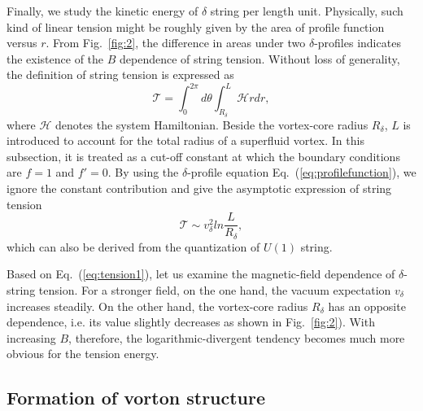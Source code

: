 \documentclass[prd, showpacs,nofootinbib,amsmath,amssymb]{revtex4}
\begin{document}
Finally, we study the kinetic energy of $\delta$ string per length unit. Physically, such kind of
linear tension might be roughly given by the area of profile function versus $r$. From Fig.~\ref{fig:2},
the difference in areas under two $\delta$-profiles indicates the existence of the $B$ dependence of
string tension.
Without loss of generality, the definition of string tension is expressed as
\begin{equation}
\mathcal{T} = \int^{2\pi}_{0}d\theta \int^L_{R_\delta}
\mathcal{H} rdr
\label{eq:tension},
\end{equation}
where $\mathcal{H}$ denotes the system Hamiltonian.
Beside the vortex-core radius $R_\delta$, $L$ is introduced to account for the total radius of a
superfluid vortex. In this subsection, it is treated as a cut-off constant at which the boundary
conditions are $f =1$ and $f' =0$.
By using the $\delta$-profile equation Eq.~(\ref{eq:profilefunction}), we ignore the constant
contribution and give the asymptotic expression of string tension
\begin{equation}
  \label{eq:tension1}
  \mathcal{T} \sim v_\delta^2 ln\frac{L}{R_\delta},
\end{equation}
which can also be derived from the quantization of $U(1)$ string.

Based on Eq.~(\ref{eq:tension1}), let us examine the magnetic-field dependence of $\delta$-string tension.
For a stronger field, on the one hand, the vacuum expectation $v_\delta$ increases steadily.
On the other hand, the vortex-core radius $R_\delta$ has an opposite dependence, i.e. its value slightly
decreases as shown in Fig.~\ref{fig:2}). With increasing $B$, therefore, the logarithmic-divergent
tendency becomes much more obvious for the tension energy. 


\subsection{Formation of vorton structure }
\label{sssec:5}
\end{document}
